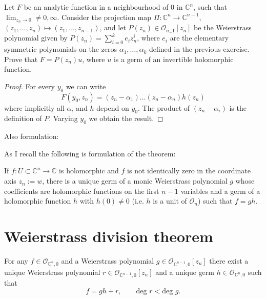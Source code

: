 \begin{exercise}
\label{exercise-weierstrass-preparation-theorem}
Let $F$ be an analytic function in a neighbourhood of $0$ in $\mathbb{C}^n$,
such that $\lim_{z_n\to 0}\neq 0,\infty$. Consider the projection map
$\Pi:\mathbb{C}^n\to\mathbb{C}^{n-1}$, 
$(z_1,\ldots,z_n)\mapsto(z_1,\ldots,z_{n-1})$, and let 
$P(z_n)\in \mathcal{O}_{n_-1}[z_n]$ be the Weierstrass polynomial given by 
$P(z_n)=\sum_{i=0}^ke_iz_n^i$, where $e_i$ are the elementary symmetric
polynomials on the zeros $\alpha_1,\ldots,\alpha_k$ defined in the previous
exercise. Prove that $F=P(z_n)u$, where $u$ is a germ of an invertible
holomorphic function.
\end{exercise}

\begin{proof}
For every $y_0$ we can write
$$
F(y_0,z_n)=(z_n-\alpha_1)\ldots(z_n-\alpha_n)h(z_n)
$$
where implicitly all $\alpha_i$ and $h$ depend on $y_0$. The product of 
$(z_n-\alpha_i)$ is the definition of $P$. Varying $y_0$ we obtain the result.
\end{proof}

\noindent
Also \cite{GH} formulation:

As I recall the following is \cite{GH} formulation of the theorem:

\begin{theorem}
If $f:U\subset\mathbb{C}^n\to\mathbb{C}$ is holomorphic and $f$ is not
identically zero in the coordinate axis $z_n:=w$, there
is a unique germ of a monic Weierstrass polynomial $g$ whose coefficients are
holomorphic functions on the first $n-1$ variables 
and a germ of a holomorphic 
function $h$ with $h(0)\neq 0$ 
(i.e. $h$ is a unit of $\mathcal{O}_n$)
such that $f=gh$.
\end{theorem}

\section{Weierstrass division theorem}
\label{section-weierstrass-division-theorem}

\begin{theorem}
\label{theorem-weierstrass-division-theorem}
For any $f \in \mathcal{O}_{\mathbb{C}^n,0}$ and
a Weierstrass polynomial $g \in \mathcal{O}_{\mathbb{C}^{n-1},0}[z_n]$
there exist a unique Weierstrass polynomial
$r \in \mathcal{O}_{\mathbb{C}^{n-1},0}[z_n]$
and a unique germ $h \in \mathcal{O}_{\mathbb{C}^n,0}$
such that
$$
f=gh+r,\qquad \text{deg }r < \text{deg }g.
$$
\end{theorem}

